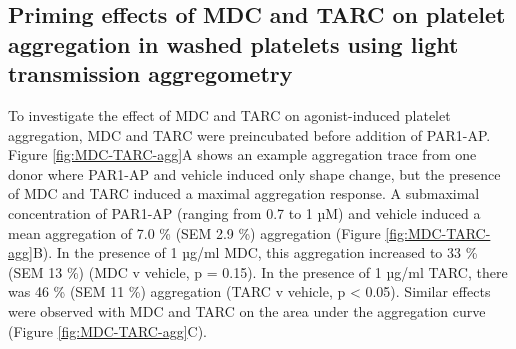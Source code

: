 \documentclass[11pt,twoside]{bristolthesis}
\begin{document}
\hypertarget{priming-effects-of-mdc-and-tarc-on-platelet-aggregation-in-washed-platelets-using-light-transmission-aggregometry}{%
\subsection{Priming effects of MDC and TARC on platelet aggregation in washed platelets using light transmission aggregometry}\label{priming-effects-of-mdc-and-tarc-on-platelet-aggregation-in-washed-platelets-using-light-transmission-aggregometry}}

To investigate the effect of MDC and TARC on agonist-induced platelet aggregation, MDC and TARC were preincubated before addition of PAR1-AP. Figure \ref{fig:MDC-TARC-agg}A shows an example aggregation trace from one donor where PAR1-AP and vehicle induced only shape change, but the presence of MDC and TARC induced a maximal aggregation response. A submaximal concentration of PAR1-AP (ranging from 0.7 to 1 µM) and vehicle induced a mean aggregation of 7.0 \% (SEM 2.9 \%) aggregation (Figure \ref{fig:MDC-TARC-agg}B). In the presence of 1 µg/ml MDC, this aggregation increased to 33 \% (SEM 13 \%) (MDC v vehicle, p = 0.15). In the presence of 1 µg/ml TARC, there was 46 \% (SEM 11 \%) aggregation (TARC v vehicle, p \textless{} 0.05). Similar effects were observed with MDC and TARC on the area under the aggregation curve (Figure \ref{fig:MDC-TARC-agg}C).
\end{document}
